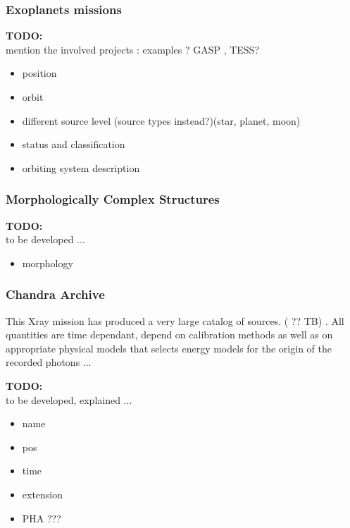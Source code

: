 \documentclass[11pt,a4paper]{ivoa}
\newcommand{\TODO}[1]{%
    \noindent%
    \colorbox{todocolor}{%
            \parbox{0.85\linewidth}{\sffamily \textbf{TODO:}\\
            #1}
    }%
    \vspace{2pt}

}
\begin{document}
\subsubsection{Exoplanets missions}
\TODO{mention the involved projects : examples ? GASP , TESS? }

\begin{itemize}
    \item position
    \item orbit
    \item different source level (source types instead?)(star, planet, moon)
    \item status and classification
    \item orbiting system description
\end{itemize}

\subsubsection{Morphologically Complex Structures}

\TODO{to be developed ...}
\begin{itemize}
    \item morphology
\end{itemize}

\subsubsection{Chandra Archive}
This Xray mission has produced a very large catalog of sources. ( ?? TB) \cite{chandra catalog, 2019}.
All quantities are time dependant, depend on calibration methods as well as on appropriate physical
models that selects energy models for the origin of the recorded photons ...
\TODO{to be developed, explained ...}
\begin{itemize}
    \item name
    \item pos
    \item time
    \item extension
    \item PHA ???
\end{itemize}
\end{document}
